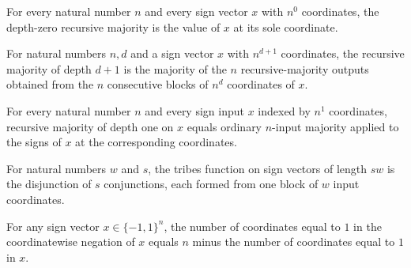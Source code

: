 \begin{theorem}
\label{FABL.recursiveMajority_zero}
\leanok
{}
For every natural number $n$ and every sign vector $x$ with $n^0$ coordinates, the
depth-zero recursive majority is the value of $x$ at its sole coordinate.
\end{theorem}

\begin{theorem}
\label{FABL.recursiveMajority_succ}
\leanok
{}
For natural numbers $n,d$ and a sign vector $x$ with $n^{d+1}$ coordinates, the
recursive majority of depth $d+1$ is the majority of the $n$ recursive-majority outputs
obtained from the $n$ consecutive blocks of $n^d$ coordinates of $x$.
\end{theorem}

\begin{theorem}
\label{FABL.recursiveMajority_one}
\leanok
{}
For every natural number $n$ and every sign input $x$ indexed by $n^1$ coordinates,
recursive majority of depth one on $x$ equals ordinary $n$-input majority applied to the
signs of $x$ at the corresponding coordinates.
\end{theorem}

\begin{definition}
\label{FABL.tribes}
\leanok
{}
For natural numbers $w$ and $s$, the tribes function on sign vectors of length $sw$ is
the disjunction of $s$ conjunctions, each formed from one block of $w$ input
coordinates.
\end{definition}

\begin{theorem}
\label{FABL.positiveCoordinateCount_negateInput}
\leanok
{}
For any sign vector $x\in\{-1,1\}^n$, the number of coordinates equal to $1$ in the
coordinatewise negation of $x$ equals $n$ minus the number of coordinates equal to $1$
in $x$.
\end{theorem}

